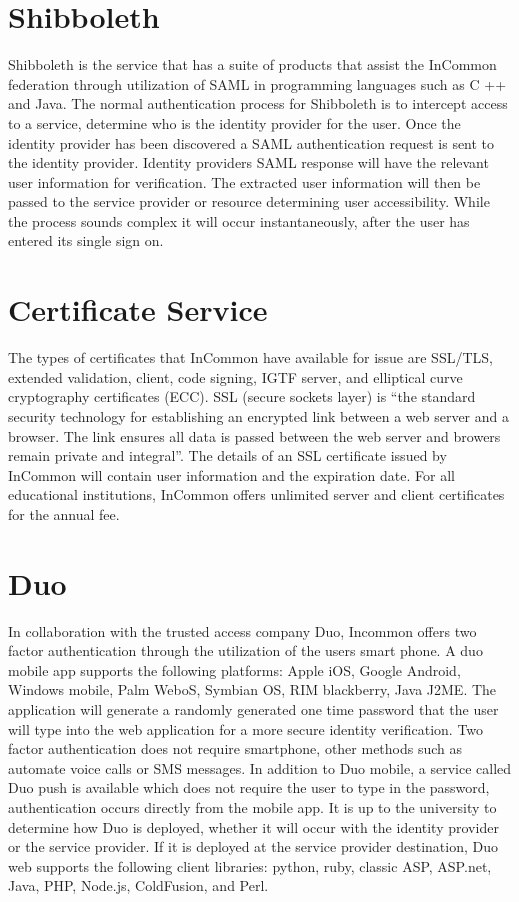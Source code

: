 \documentclass[9pt,twocolumn,twoside]{../../styles/osajnl}
\begin{document}
\section{Shibboleth}

Shibboleth is the service that has a suite of products that assist the
InCommon federation through utilization of SAML in programming
languages such as C ++ and Java\cite{www-shibboleth}.  The normal
authentication process for Shibboleth is to intercept access to a
service, determine who is the identity provider for the user.  Once
the identity provider has been discovered a SAML authentication
request is sent to the identity provider.  Identity providers SAML
response will have the relevant user information for verification.
The extracted user information will then be passed to the service
provider or resource determining user accessibility.  While the
process sounds complex it will occur instantaneously, after the user
has entered its single sign on.


\section{Certificate Service}

The types of certificates that InCommon have available for issue are
SSL/TLS, extended validation, client, code signing, IGTF server, and
elliptical curve cryptography certificates (ECC).  SSL (secure sockets
layer) is “the standard security technology for establishing an
encrypted link between a web server and a browser.  The link ensures
all data is passed between the web server and browers remain private
and integral”\cite{www-ssl}.  The details of an SSL certificate
issued by InCommon will contain user information and the
expiration date. For all educational institutions, InCommon offers
unlimited server and client certificates for the annual fee.

\section{Duo}

In collaboration with the trusted access company Duo, Incommon offers
two factor authentication through the utilization of the users smart
phone\cite{www-duo}.  A duo mobile app supports the following
platforms: Apple iOS, Google Android, Windows mobile, Palm WeboS,
Symbian OS, RIM blackberry, Java J2ME.  The application will generate
a randomly generated one time password that the user will type into
the web application for a more secure identity verification.  Two
factor authentication does not require smartphone, other methods such
as automate voice calls or SMS messages.  In addition to Duo mobile, a
service called Duo push is available which does not require the user
to type in the password, authentication occurs directly from the
mobile app.  It is up to the university to determine how Duo is
deployed, whether it will occur with the identity provider or the
service provider.  If it is deployed at the service provider
destination, Duo web supports the following client libraries: python,
ruby, classic ASP, ASP.net, Java, PHP, Node.js, ColdFusion, and Perl.
\end{document}
